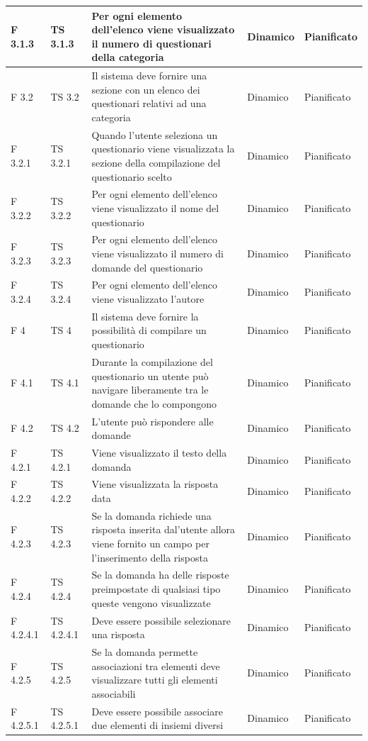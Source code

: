 \documentclass[a4paper,11pt]{article}
\begin{document}
\begin{longtable}{p{}p{}p{}p{}p{}}
\midrule
F 3.1.3 & TS 3.1.3 &Per ogni elemento dell'elenco viene visualizzato il numero di questionari della categoria & Dinamico &Pianificato\\
\midrule
F 3.2 & TS 3.2 &Il sistema deve fornire una sezione con un elenco dei questionari relativi ad una categoria & Dinamico &Pianificato\\
\midrule
F 3.2.1 &TS 3.2.1&Quando l'utente seleziona un questionario viene visualizzata la sezione della compilazione del questionario scelto & Dinamico &Pianificato\\
\midrule
F 3.2.2 &TS 3.2.2&Per ogni elemento dell'elenco viene visualizzato il nome del questionario & Dinamico &Pianificato\\
\midrule
F 3.2.3 & TS 3.2.3 &Per ogni elemento dell'elenco viene visualizzato il numero di domande del questionario & Dinamico &Pianificato\\
\midrule
F 3.2.4 &TS 3.2.4 &Per ogni elemento dell'elenco viene visualizzato l'autore & Dinamico &Pianificato\\
\midrule
F 4 & TS 4&Il sistema deve fornire la possibilità di compilare un questionario & Dinamico &Pianificato\\
\midrule
F 4.1 &TS 4.1 &Durante la compilazione del questionario un utente può navigare liberamente tra le domande che lo compongono & Dinamico &Pianificato\\
\midrule
F 4.2 & TS 4.2 &L'utente può rispondere alle domande & Dinamico &Pianificato\\
\midrule
F 4.2.1 &TS 4.2.1&Viene visualizzato il testo della domanda & Dinamico &Pianificato\\
\midrule
F 4.2.2 &TS 4.2.2 &Viene visualizzata la risposta data & Dinamico &Pianificato\\
\midrule
F 4.2.3 & TS 4.2.3 &Se la domanda richiede una risposta inserita dal'utente allora viene fornito un campo per l'inserimento della risposta & Dinamico &Pianificato\\
\midrule
F 4.2.4 &TS 4.2.4 &Se la domanda ha delle risposte preimpostate di qualsiasi tipo queste vengono visualizzate & Dinamico &Pianificato\\
\midrule
F 4.2.4.1 & TS 4.2.4.1 &Deve essere possibile selezionare una risposta & Dinamico &Pianificato\\
\midrule
F 4.2.5 & TS 4.2.5 &Se la domanda permette associazioni tra elementi deve visualizzare tutti gli elementi associabili & Dinamico &Pianificato\\
\midrule
F 4.2.5.1 & TS 4.2.5.1 &Deve essere possibile associare due elementi di insiemi diversi & Dinamico &Pianificato\\

\end{longtable}
\end{document}
